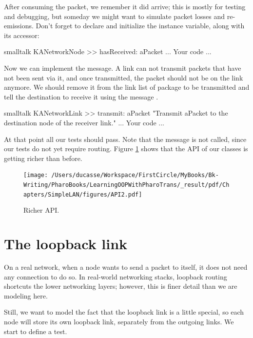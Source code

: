 \documentclass[10pt,twoside,english]{_support/latex/sbabook/sbabook}
\begin{document}
After consuming the packet, we remember it did arrive; this is mostly for testing and debugging, but someday we might want to simulate packet losses and re-emissions.
Don't forget to declare and initialize the  instance variable, along with its accessor:

\begin{displaycode}{smalltalk}
KANetworkNode >> hasReceived: aPacket
	... Your code ...
\end{displaycode}

Now we can implement the  message. A link can not transmit packets that have not been sent via it, and once transmitted, the packet should not be on the link anymore. We should remove it from the link list of package to be transmitted
and tell the destination to receive it using the message .

\begin{displaycode}{smalltalk}
KANetworkLink >> transmit: aPacket
    "Transmit aPacket to the destination node of the receiver link."
    ... Your code ...
\end{displaycode}

At that point all our tests should pass.
Note that the message  is not called, since our tests do not yet require routing.
Figure \ref{Api2} shows that the API of our classes is getting richer than before. 


\begin{figure}

\begin{center}
\texttt{[image: /Users/ducasse/Workspace/FirstCircle/MyBooks/Bk-Writing/PharoBooks/LearningOOPWithPharoTrans/\_result/pdf/Chapters/SimpleLAN/figures/API2.pdf]}\caption{Richer API.\label{Api2}}\end{center}
\end{figure}

\section{The loopback link}
On a real network, when a node wants to send a packet to itself, it does not need any connection to do so.
In real-world networking stacks, loopback routing shortcuts the lower networking layers; however, this is finer detail than we are modeling here.

Still, we want to model the fact that the loopback link is a little special, so each node will store its own loopback link, separately from the outgoing links. We start to define a test. 
\end{document}
